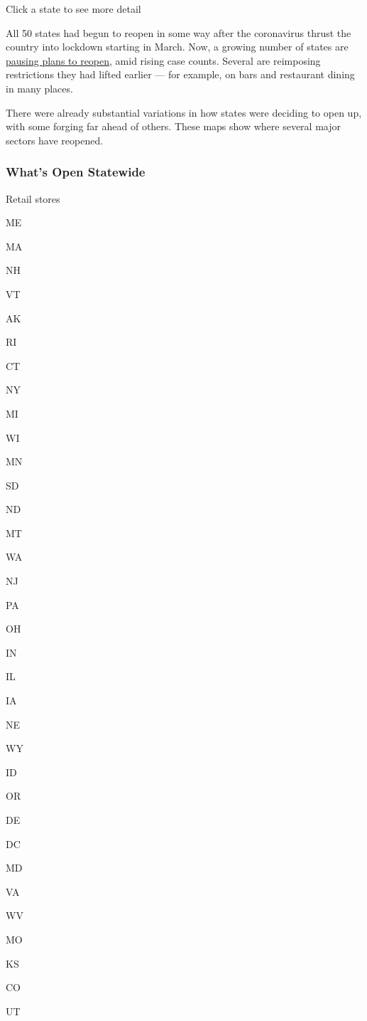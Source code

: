 Click a state to see more detail

All 50 states had begun to reopen in some way after the coronavirus
thrust the country into lockdown starting in March. Now, a growing
number of states are
\href{https://www.nytimes3xbfgragh.onion/2020/06/25/us/texas-coronavirus-cases-reopening.html}{pausing
plans to reopen}, amid rising case counts. Several are reimposing
restrictions they had lifted earlier --- for example, on bars and
restaurant dining in many places.

There were already substantial variations in how states were deciding to
open up, with some forging far ahead of others. These maps show where
several major sectors have reopened.

\hypertarget{whats-open-statewide}{%
\subsubsection{What's Open Statewide}\label{whats-open-statewide}}

Retail stores

ME

MA

NH

VT

AK

RI

CT

NY

MI

WI

MN

SD

ND

MT

WA

NJ

PA

OH

IN

IL

IA

NE

WY

ID

OR

DE

DC

MD

VA

WV

MO

KS

CO

UT

